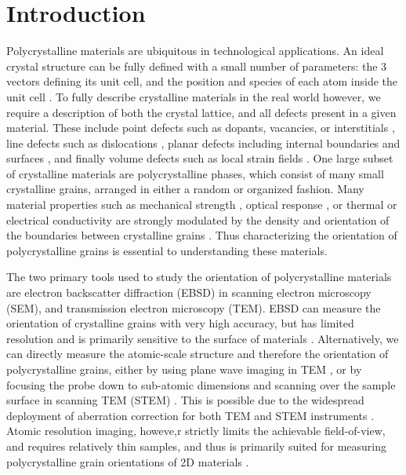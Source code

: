\documentclass[%
 superscriptaddress,
 aip,
 amsmath,amssymb,
reprint,%
 author-year,%
longbibliography
]{revtex4-2}
\begin{document}
\section*{Introduction}

Polycrystalline materials are ubiquitous in technological applications. An ideal crystal structure can be fully defined with a small number of parameters: the 3 vectors defining its unit cell, and the position and species of each atom inside the unit cell \citep{borchardt2011crystallography}. To fully describe crystalline materials in the real world however, we require a description of both the crystal lattice, and all defects present in a given material. These include point defects such as dopants, vacancies, or interstitials \citep{dederichs1978lattice}, line defects such as dislocations \citep{lesar2014simulations}, planar defects including internal boundaries and surfaces \citep{tang2006diffuse}, and finally volume defects such as local strain fields \citep{janssen2007stress}. One large subset of crystalline materials are polycrystalline phases, which consist of many small crystalline grains, arranged in either a random or organized fashion. Many material properties such as mechanical strength \citep{thompson2000structure}, optical response \citep{park2019efficient, londono2021intrinsic}, or thermal or electrical conductivity \citep{castro2019role} are strongly modulated by the density and orientation of the boundaries between crystalline grains \cite{thompson1995texture}. Thus characterizing the orientation of polycrystalline grains is essential to understanding these materials.

The two primary tools used to study the orientation of polycrystalline materials are electron backscatter diffraction (EBSD) in scanning electron microscopy (SEM), and transmission electron microscopy (TEM). EBSD can measure the orientation of crystalline grains with very high accuracy, but has limited resolution and is primarily sensitive to the surface of materials \citep{humphreys2001review, wright2011review, wright2015introduction}. Alternatively, we can directly measure the atomic-scale structure and therefore the orientation of polycrystalline grains, either by using plane wave imaging in TEM \citep{li2020constrained}, or by focusing the probe down to sub-atomic dimensions and scanning over the sample surface in scanning TEM (STEM) \citep{peter2018segregation}. This is possible due to the widespread deployment of aberration correction for both TEM and STEM instruments \citep{linck2016chromatic, ramasse2017twenty}. Atomic resolution imaging, howeve,r strictly limits the achievable field-of-view, and requires relatively thin samples, and thus is primarily suited for measuring polycrystalline grain orientations of 2D materials \citep{ophus2015large, qi2020near}.
\end{document}
